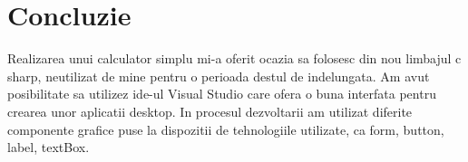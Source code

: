 \section*{Concluzie}

Realizarea unui calculator simplu mi-a oferit ocazia sa folosesc din nou limbajul c sharp, neutilizat de mine pentru o perioada destul de indelungata. Am avut posibilitate sa utilizez ide-ul Visual Studio care ofera o buna interfata pentru crearea unor aplicatii desktop. In procesul dezvoltarii am utilizat diferite componente grafice puse la dispozitii de tehnologiile utilizate, ca form, button, label, textBox.

\clearpage